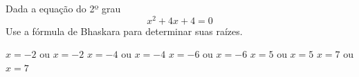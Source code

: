 Dada a equação do 2º grau
\[x^2+4x+4=0\]
Use a fórmula de Bhaskara para determinar suas raízes.

$x=-2$ ou $x=-2$
$x=-4$ ou $x=-4$
$x=-6$ ou $x=-6$
$x=5$ ou $x=5$
$x=7$ ou $x=7$



